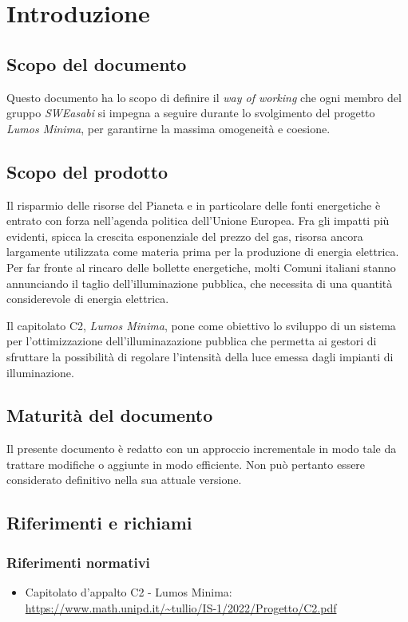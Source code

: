 \chapter{Introduzione}
\section{Scopo del documento}
Questo documento ha lo scopo di definire il \textit{way of working} che ogni membro del gruppo \textit{SWEasabi} si impegna a seguire durante lo svolgimento del progetto \textit{Lumos Minima}, per garantirne la massima omogeneità e coesione.

\section{Scopo del prodotto}
Il risparmio delle risorse del Pianeta e in particolare delle fonti energetiche è entrato con forza nell'agenda politica dell’Unione Europea. Fra gli impatti più evidenti, spicca la crescita esponenziale del prezzo del gas, risorsa ancora largamente utilizzata come materia prima per la produzione di energia elettrica.
Per far fronte al rincaro delle bollette energetiche, molti Comuni italiani stanno annunciando il taglio dell’illuminazione pubblica, che necessita di una quantità considerevole di energia elettrica.

Il capitolato C2, \textit{Lumos Minima}, pone come obiettivo lo sviluppo di un sistema per l'ottimizzazione dell'illuminazazione pubblica che permetta ai gestori di sfruttare la possibilità di regolare l'intensità della luce emessa dagli impianti di illuminazione.

\section{Maturità del documento}
Il presente documento è redatto con un approccio incrementale in modo tale da trattare modifiche o aggiunte in modo efficiente. Non può pertanto essere considerato definitivo nella sua attuale versione.


\section{Riferimenti e richiami}
\subsection{Riferimenti normativi}
\begin{itemize}
    \item Capitolato d'appalto C2 - Lumos Minima: \\ \url{https://www.math.unipd.it/~tullio/IS-1/2022/Progetto/C2.pdf}
\end{itemize}

